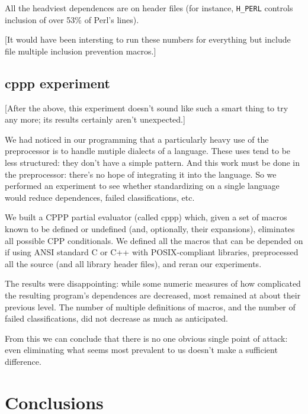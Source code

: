 \documentclass[10pt]{article}
\begin{document}
        All the headviest dependences are on header files (for instance,
          \verb|H_PERL| controls inclusion of over 53\% of Perl's lines).

        [It would have been intersting to run these numbers for everything
          but include file multiple inclusion prevention macros.]


\subsection{cppp experiment}

    [After the above, this experiment doesn't sound like such a smart thing
      to try any more; its results certainly aren't unexpected.]

    We had noticed in our programming that a particularly heavy use of the
      preprocessor is to handle mutiple dialects of a language.  These uses
      tend to be less structured:  they don't have a simple pattern.  And
      this work must be done in the preprocessor:  there's no hope of
      integrating it into the language.  So we performed an experiment to
      see whether standardizing on a single language would reduce
      dependences, failed classifications, etc.

    We built a CPPP partial evaluator (called cppp) which, given a set of
      macros known to be defined or undefined (and, optionally, their
      expansions), eliminates all possible CPP conditionals.  We defined
      all the macros that can be depended on if using ANSI standard C or
      C++ with POSIX-compliant libraries, preprocessed all the source (and
      all library header files), and reran our experiments.

    The results were disappointing:  while some numeric measures of how
      complicated the resulting program's dependences are decreased, most
      remained at about their previous level.  The number of multiple
      definitions of macros, and the number of failed classifications, did
      not decrease as much as anticipated.

    From this we can conclude that there is no one obvious single point of
      attack:  even eliminating what seems most prevalent to us doesn't
      make a sufficient difference.



\section{Conclusions}
\label{sec:conclusion}
\end{document}
